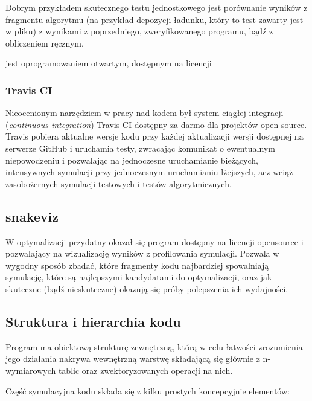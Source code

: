     Dobrym przykładem skutecznego testu jednostkowego jest porównanie wyników z fragmentu
    algorytmu (na przykład depozycji ładunku, który to test zawarty jest w pliku)
     
    z wynikami z poprzedniego, zweryfikowanego programu, bądź z obliczeniem ręcznym.

     jest oprogramowaniem otwartym, dostępnym na licencji 

    \subsubsection{Travis CI}
    Nieocenionym narzędziem w pracy nad kodem był system ciągłej integracji (\emph{continuous integration})
    Travis CI 
    dostępny za darmo dla projektów open-source. Travis pobiera aktualne wersje kodu przy każdej aktualizacji
    wersji dostępnej na serwerze GitHub i uruchamia testy, zwracając komunikat o ewentualnym niepowodzeniu i
    pozwalając na jednoczesne uruchamianie bieżących, intensywnych symulacji przy jednoczesnym uruchamianiu
    lżejszych, acz wciąż zasobożernych 
    symulacji testowych i testów algorytmicznych.

    \subsection{snakeviz}
    W optymalizacji przydatny okazał się program  dostępny na licencji opensource i pozwalający na
    wizualizację wyników z profilowania symulacji. Pozwala w wygodny sposób zbadać, które fragmenty kodu najbardziej
    spowalniają symulację, które są najlepszymi kandydatami do optymalizacji, oraz jak skuteczne (bądź nieskuteczne)
    okazują się próby polepszenia ich wydajności.

    \subsection{Struktura i hierarchia kodu}

    Program ma obiektową strukturę zewnętrzną, którą w celu łatwości zrozumienia jego działania nakrywa wewnętrzną warstwę
    składającą się głównie z n-wymiarowych tablic  oraz zwektoryzowanych operacji na nich.

    Część symulacyjna kodu składa się z kilku prostych koncepcyjnie elementów:

